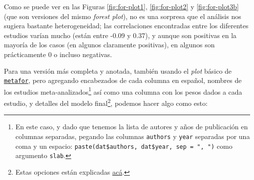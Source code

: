 \documentclass[
  bookmarksnumbered]{article}
\begin{document}
Como se puede ver en las Figuras \ref{fig:for-plot1}, \ref{fig:for-plot2} y \ref{fig:for-plot3b} (que son versiones del mismo \emph{forest plot}), no es una sorpresa que el análisis nos sugiera bastante heterogeneidad; las correlaciones encontradas entre los diferentes estudios varían mucho (están entre -0.09 y 0.37), y aunque son positivas en la mayoría de los casos (en algunos claramente positivas), en algunos son prácticamente 0 o incluso negativas.

Para una versión más completa y anotada, también usando el \emph{plot} básico de \href{https://www.metafor-project.org/doku.php}{\texttt{metafor}}, pero agregando encabezados de cada columna en español, nombres de los estudios meta-analizados\footnote{En este caso, y dado que tenemos la lista de autores y años de publicación en columnas separadas, pegando las columnas \texttt{authors} y \texttt{year} separadas por una coma y un espacio: \texttt{paste(dat\$authors,\ dat\$year,\ sep\ =\ ",\ ")} como argumento \texttt{slab}.} así como una columna con los pesos dados a cada estudio, y detalles del modelo final\footnote{Estas opciones están explicadas \href{https://search.r-project.org/CRAN/refmans/metafor/html/forest.rma.html}{acá}.}, podemos hacer algo como esto:
\end{document}
